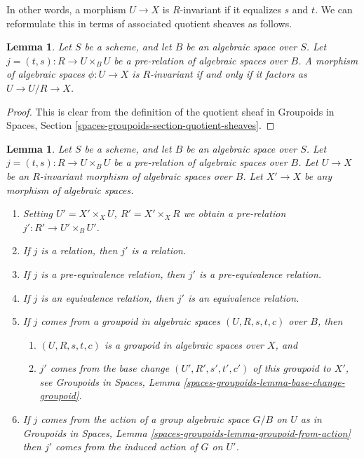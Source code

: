 \documentclass{stacks-project}
\theoremstyle{plain}
\newtheorem{lemma}[subsection]{Lemma}
\theoremstyle{definition}
\theoremstyle{remark}
\numberwithin{equation}{subsection}
\begin{document}
\noindent
In other words, a morphism $U \to X$ is $R$-invariant if it equalizes
$s$ and $t$.  We can reformulate this in terms of associated quotient
sheaves as follows.

\begin{lemma}
\label{lemma-invariant}
Let $S$ be a scheme, and let $B$ be an algebraic space over $S$.
Let $j = (t, s) : R \to U \times_B U$ be a pre-relation of algebraic
spaces over $B$. A morphism of algebraic spaces $\phi : U \to X$ is
$R$-invariant if and only if it factors as
$U \to U/R \to X$.
\end{lemma}

\begin{proof}
This is clear from the definition of the quotient sheaf in
Groupoids in Spaces, Section \ref{spaces-groupoids-section-quotient-sheaves}.
\end{proof}

\begin{lemma}
\label{lemma-base-change-on-invariant}
Let $S$ be a scheme, and let $B$ be an algebraic space over $S$.
Let $j = (t, s) : R \to U \times_B U$ be a pre-relation of algebraic
spaces over $B$. Let $U \to X$ be an $R$-invariant morphism of algebraic
spaces over $B$. Let $X' \to X$ be any morphism of algebraic spaces.
\begin{enumerate}
\item Setting $U' = X' \times_X U$, $R' = X' \times_X R$ we obtain
a pre-relation $j' : R' \to U' \times_B U'$.
\item If $j$ is a relation, then $j'$ is a relation.
\item If $j$ is a pre-equivalence relation, then $j'$ is a
pre-equivalence relation.
\item If $j$ is an equivalence relation, then $j'$ is an equivalence
relation.
\item If $j$ comes from a groupoid in algebraic spaces
$(U, R, s, t, c)$ over $B$, then
\begin{enumerate}
\item $(U, R, s, t, c)$ is a groupoid in algebraic spaces over $X$, and
\item $j'$ comes from the base change $(U', R', s', t', c')$
of this groupoid to $X'$, see
Groupoids in Spaces, Lemma
\ref{spaces-groupoids-lemma-base-change-groupoid}.
\end{enumerate}
\item If $j$ comes from the action of a group algebraic space $G/B$ on $U$
as in Groupoids in Spaces, Lemma
\ref{spaces-groupoids-lemma-groupoid-from-action}
then $j'$ comes from the induced action of $G$ on $U'$.
\end{enumerate}
\end{lemma}
\end{document}

